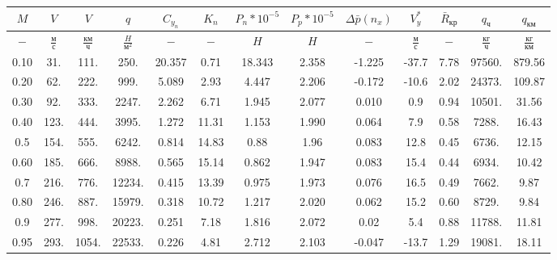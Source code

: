 \begin{tabular}{|c|c|c|c|c|c|c|c|c|c|c|c|c|}
\hline
$M$ & $V$ & $V$ & $q$ & $C_{y_n}$ & $K_n$ & $P_n*10^{-5}$ & $P_p*10^{-5}$ & $\Delta \bar{p}(n_x)$ & $V_y^*$ & $\bar{R}_{кр}$ & $q_{ч}$ & $q_{км}$ \\ 
\hline
$-$ & $\frac{м}{с}$ & $\frac{км}{ч}$ & $\frac{H}{м^2}$ & $-$ & $-$ & $H$ & $H$ & $-$ & $\frac{м}{с}$ & $-$ & $\frac{кг}{ч}$ & $\frac{кг}{км}$ \\ 
\hline
0.10 & 31. & 111. & 250. & 20.357 & 0.71 & 18.343 & 2.358 & -1.225 & -37.7 & 7.78 & 97560. & 879.56 \\ 
\hline
0.20 & 62. & 222. & 999. & 5.089 & 2.93 & 4.447 & 2.206 & -0.172 & -10.6 & 2.02 & 24373. & 109.87 \\ 
\hline
0.30 & 92. & 333. & 2247. & 2.262 & 6.71 & 1.945 & 2.077 & 0.010 & 0.9 & 0.94 & 10501. & 31.56 \\ 
\hline
0.40 & 123. & 444. & 3995. & 1.272 & 11.31 & 1.153 & 1.990 & 0.064 & 7.9 & 0.58 & 7288. & 16.43 \\ 
\hline
0.5 & 154. & 555. & 6242. & 0.814 & 14.83 & 0.88 & 1.96 & 0.083 & 12.8 & 0.45 & 6736. & 12.15 \\ 
\hline
0.60 & 185. & 666. & 8988. & 0.565 & 15.14 & 0.862 & 1.947 & 0.083 & 15.4 & 0.44 & 6934. & 10.42 \\ 
\hline
0.7 & 216. & 776. & 12234. & 0.415 & 13.39 & 0.975 & 1.973 & 0.076 & 16.5 & 0.49 & 7662. & 9.87 \\ 
\hline
0.80 & 246. & 887. & 15979. & 0.318 & 10.72 & 1.217 & 2.020 & 0.062 & 15.2 & 0.60 & 8729. & 9.84 \\ 
\hline
0.9 & 277. & 998. & 20223. & 0.251 & 7.18 & 1.816 & 2.072 & 0.02 & 5.4 & 0.88 & 11788. & 11.81 \\ 
\hline
0.95 & 293. & 1054. & 22533. & 0.226 & 4.81 & 2.712 & 2.103 & -0.047 & -13.7 & 1.29 & 19081. & 18.11 \\ 
\hline
\end{tabular}